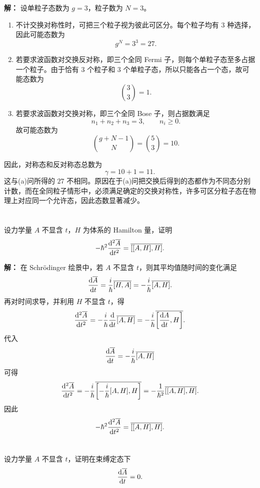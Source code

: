 \documentclass[12pt,a4paper]{article}
\begin{document}
\vspace{0.5cm}
\noindent\textbf{解：}
设单粒子态数为 $g=3$，粒子数为 $N=3$。
\begin{enumerate}[label=(\alph*)]
    \item 不计交换对称性时，可把三个粒子视为彼此可区分。每个粒子均有 $3$ 种选择，因此可能态数为
    \[
    g^N=3^3=27.
    \]

    \item 若要求波函数对交换反对称，即三个全同 Fermi 子，则每个单粒子态至多占据一个粒子。由于恰有 $3$ 个粒子和 $3$ 个单粒子态，所以只能各占一个态，故可能态数为
    \[
    \binom{3}{3}=1.
    \]

    \item 若要求波函数对交换对称，即三个全同 Bose 子，则占据数满足
    \[
    n_1+n_2+n_3=3,\qquad n_i\ge 0.
    \]
    故可能态数为
    \[
    \binom{g+N-1}{N}=\binom{5}{3}=10.
    \]
\end{enumerate}
因此，对称态和反对称态总数为
\[
\gamma=10+1=11.
\]
这与(a)问所得的 $27$ 不相同。原因在于(a)问把交换后得到的态都作为不同态分别计数，而在全同粒子情形中，必须满足确定的交换对称性，许多可区分粒子态在物理上对应同一个允许态，因此态数显著减少。

\section{}

设力学量 $A$ 不显含 $t$，$H$ 为体系的 Hamilton 量，证明
\[
-\hbar^2 \dv[2]{\overline{A}}{t}=\overline{\comm{\comm{A}{H}}{H}}.
\]

\vspace{0.5cm}
\noindent\textbf{解：}
在 Schrödinger 绘景中，若 $A$ 不显含 $t$，则其平均值随时间的变化满足
\[
\dv{\overline{A}}{t}=\frac{i}{\hbar}\overline{\comm{H}{A}} = -\frac{i}{\hbar}\overline{\comm{A}{H}}.
\]
再对时间求导，并利用 $H$ 不显含 $t$，得
\[
\dv[2]{\overline{A}}{t}= -\frac{i}{\hbar}\dv{}{t}\overline{\comm{A}{H}}
= -\frac{i}{\hbar}\overline{\comm{\dv{A}{t}}{H}}.
\]
代入
\[
\dv{\overline{A}}{t}= -\frac{i}{\hbar}\overline{\comm{A}{H}}
\]
可得
\[
\dv[2]{\overline{A}}{t}= -\frac{i}{\hbar}\overline{\comm{-\frac{i}{\hbar}\comm{A}{H}}{H}}
= -\frac{1}{\hbar^2}\overline{\comm{\comm{A}{H}}{H}}.
\]
因此
\[
-\hbar^2 \dv[2]{\overline{A}}{t}=\overline{\comm{\comm{A}{H}}{H}}.
\]

\section{}

设力学量 $A$ 不显含 $t$，证明在束缚定态下
\[
\dv{\overline{A}}{t}=0.
\]
\end{document}
